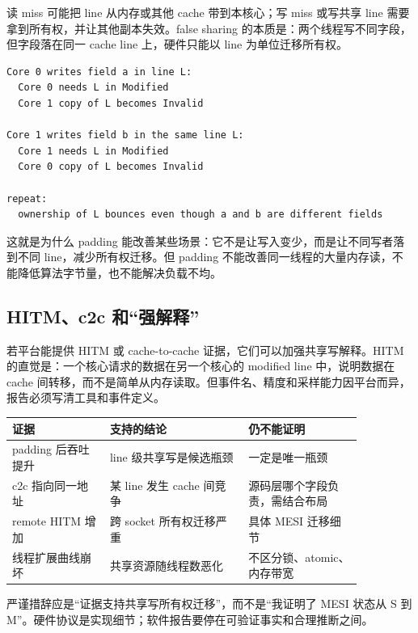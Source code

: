 读 miss 可能把 line 从内存或其他 cache 带到本核心；写 miss 或写共享 line 需要拿到所有权，并让其他副本失效。false sharing 的本质是：两个线程写不同字段，但字段落在同一 cache line 上，硬件只能以 line 为单位迁移所有权。

\begin{lstlisting}[numbers=none,caption={两个核心写同一 line 的状态直觉}]
Core 0 writes field a in line L:
  Core 0 needs L in Modified
  Core 1 copy of L becomes Invalid

Core 1 writes field b in the same line L:
  Core 1 needs L in Modified
  Core 0 copy of L becomes Invalid

repeat:
  ownership of L bounces even though a and b are different fields
\end{lstlisting}

这就是为什么 padding 能改善某些场景：它不是让写入变少，而是让不同写者落到不同 line，减少所有权迁移。但 padding 不能改善同一线程的大量内存读，不能降低算法字节量，也不能解决负载不均。

\subsection{HITM、c2c 和“强解释”}

若平台能提供 HITM 或 cache-to-cache 证据，它们可以加强共享写解释。HITM 的直觉是：一个核心请求的数据在另一个核心的 modified line 中，说明数据在 cache 间转移，而不是简单从内存读取。但事件名、精度和采样能力因平台而异，报告必须写清工具和事件定义。

\begin{center}
\begin{tabular}{p{0.24\linewidth}p{0.34\linewidth}p{0.28\linewidth}}
\toprule
证据 & 支持的结论 & 仍不能证明 \\
\midrule
padding 后吞吐提升 & line 级共享写是候选瓶颈 & 一定是唯一瓶颈 \\
c2c 指向同一地址 & 某 line 发生 cache 间竞争 & 源码层哪个字段负责，需结合布局 \\
remote HITM 增加 & 跨 socket 所有权迁移严重 & 具体 MESI 迁移细节 \\
线程扩展曲线崩坏 & 共享资源随线程数恶化 & 不区分锁、atomic、内存带宽 \\
\bottomrule
\end{tabular}
\end{center}

严谨措辞应是“证据支持共享写所有权迁移”，而不是“我证明了 MESI 状态从 S 到 M”。硬件协议是实现细节；软件报告要停在可验证事实和合理推断之间。

